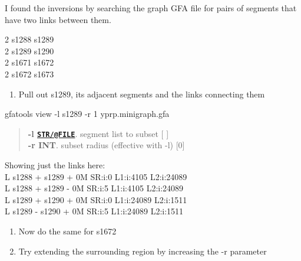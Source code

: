 \documentclass[
]{book}
\newenvironment{Shaded}{\begin{snugshade}}{\end{snugshade}}
\newcommand{\AttributeTok}[1]{\textcolor[rgb]{0.77,0.63,0.00}{#1}}
\newcommand{\ExtensionTok}[1]{#1}
\newcommand{\FunctionTok}[1]{\textcolor[rgb]{0.00,0.00,0.00}{#1}}
\newcommand{\KeywordTok}[1]{\textcolor[rgb]{0.13,0.29,0.53}{\textbf{#1}}}
\newcommand{\NormalTok}[1]{#1}
\newcommand{\StringTok}[1]{\textcolor[rgb]{0.31,0.60,0.02}{#1}}
\providecommand{\tightlist}{%
  \setlength{\itemsep}{0pt}\setlength{\parskip}{0pt}}
\begin{document}
I found the inversions by searching the graph GFA file for pairs of segments that have two links between them.

\begin{Shaded}
\end{Shaded}

2 s1288 s1289\\
2 s1289 s1290\\
2 s1671 s1672\\
2 s1672 s1673

\begin{enumerate}
\def\labelenumi{\arabic{enumi}.}
\tightlist
\item
  Pull out s1289, its adjacent segments and the links connecting them
\end{enumerate}

\begin{Shaded}
\begin{Highlighting}[]
\ExtensionTok{gfatools}\NormalTok{ view }\AttributeTok{{-}l}\NormalTok{ s1289 }\AttributeTok{{-}r}\NormalTok{ 1 yprp.minigraph.gfa}
\end{Highlighting}
\end{Shaded}

\begin{quote}
\textbf{-l \href{mailto:STR/@FILE}{\nolinkurl{STR/@FILE}}}. segment list to subset {[} {]}\\
\textbf{-r INT}. subset radius (effective with -l) {[}0{]}
\end{quote}

Showing just the links here:\\
L s1288 + s1289 + 0M SR:i:0 L1:i:4105 L2:i:24089\\
L s1288 + s1289 - 0M SR:i:5 L1:i:4105 L2:i:24089\\
L s1289 + s1290 + 0M SR:i:0 L1:i:24089 L2:i:1511\\
L s1289 - s1290 + 0M SR:i:5 L1:i:24089 L2:i:1511

\begin{enumerate}
\def\labelenumi{\arabic{enumi}.}
\setcounter{enumi}{1}
\item
  Now do the same for s1672
\item
  Try extending the surrounding region by increasing the -r parameter
\end{enumerate}
\end{document}
